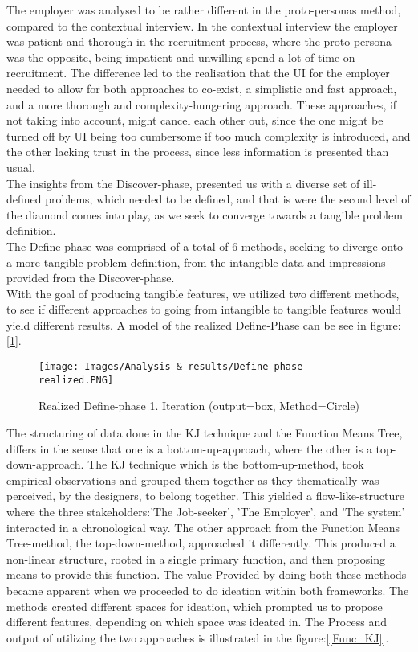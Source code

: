 The employer was analysed to be rather different in the proto-personas method, compared to the contextual interview. In the contextual interview the employer was patient and thorough in the recruitment process, where the proto-persona was the opposite, being impatient and unwilling spend a lot of time on recruitment. The difference led to the realisation that the UI for the employer needed to allow for both approaches to co-exist, a simplistic and fast approach, and a more thorough and complexity-hungering approach. These approaches, if not taking into account, might cancel each other out, since the one might be turned off by UI being too cumbersome if too much complexity is introduced, and the other lacking trust in the process, since less information is presented than usual. \\

The insights from the Discover-phase, presented us with a diverse set of ill-defined problems, which needed to be defined, and that is were the second level of the diamond comes into play, as we seek to converge towards a tangible problem definition. \\

The Define-phase was comprised of a total of 6 methods, seeking to diverge onto a more tangible problem definition, from the intangible data and impressions provided from the Discover-phase.\\

With the goal of producing tangible features, we utilized two different methods, to see if different approaches to going from intangible to tangible features would yield different results. A model of the realized Define-Phase can be see in figure:[\ref{DefineReal}].

\begin{figure}[H]
\caption{Realized Define-phase 1. Iteration (output=box, Method=Circle)}
\centering
\label{DefineReal}
\texttt{[image: Images/Analysis \& results/Define-phase realized.PNG]}
\end{figure}

The structuring of data done in the KJ technique and the Function Means Tree, differs in the sense that one is a bottom-up-approach, where the other is a top-down-approach. The KJ technique which is the bottom-up-method, took empirical observations and grouped them together as they thematically was perceived, by the designers, to belong together. This yielded a flow-like-structure where the three stakeholders:'The Job-seeker', 'The Employer', and 'The system' interacted in a chronological way. The other approach from the Function Means Tree-method, the top-down-method, approached it differently. This produced a non-linear structure, rooted in a single primary function, and then proposing means to provide this function. The value Provided by doing both these methods became apparent when we proceeded to do ideation within both frameworks. The methods created different spaces for ideation, which prompted us to propose different features, depending on which space was ideated in. The Process and output of utilizing the two approaches is illustrated in the figure:[\ref{Func_KJ}]. 

